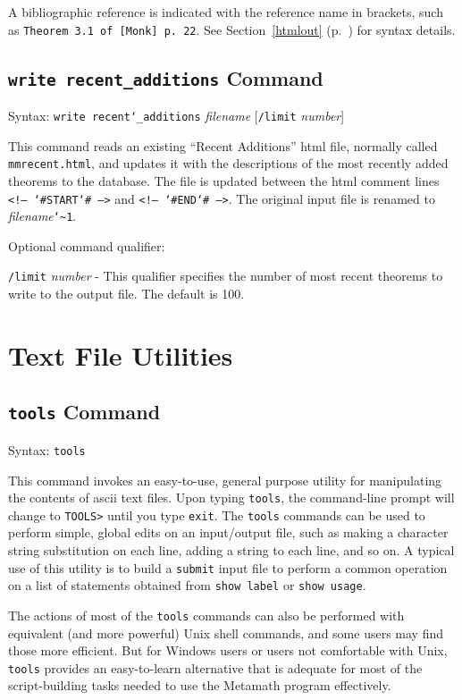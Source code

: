 A bibliographic reference is indicated with the reference name
in brackets, such as  \texttt{Theorem 3.1 of
[Monk] p.\ 22}.
See Section~\ref{htmlout} (p.~\pageref{htmlout}) for
syntax details.


\subsection{\texttt{write recent\_additions}
Command}
Syntax:  \texttt{write recent{\char`\_}additions} {\em filename}
[\texttt{/limit} {\em number}]

This command reads an existing ``Recent Additions'' {\sc html} file,
normally called \texttt{mmrecent.html}, and updates it with the
descriptions of the most recently added theorems to the database.
 The file is updated between
the {\sc html} comment lines \texttt{<!-- {\char`\#}START{\char`\#} -->}
and \texttt{<!-- {\char`\#}END{\char`\#} -->}.  The original input file
is renamed to {\em filename}\texttt{{\char`\~}1}.

Optional command qualifier:

    \texttt{/limit} {\em number} -
 This qualifier specifies the number of most recent theorems to
   write to the output file.  The default is 100.


\section{Text File Utilities}

\subsection{\texttt{tools} Command}
Syntax:  \texttt{tools}

This command invokes an easy-to-use, general purpose utility for
manipulating the contents of {\sc ascii} text files.  Upon typing
\texttt{tools}, the command-line prompt will change to \texttt{TOOLS>}
until you type \texttt{exit}.  The \texttt{tools} commands can be used
to perform simple, global edits on an input/output file,
such as making a character string substitution on each line, adding a
string to each line, and so on.  A typical use of this utility is
to build a \texttt{submit} input file to perform a common operation on a
list of statements obtained from \texttt{show label} or \texttt{show
usage}.

The actions of most of the \texttt{tools} commands can also be
performed with equivalent (and more powerful) Unix shell commands, and
some users may find those more efficient.  But for Windows users or
users not comfortable with Unix, \texttt{tools} provides an
easy-to-learn alternative that is adequate for most of the
script-building tasks needed to use the Metamath program effectively.

